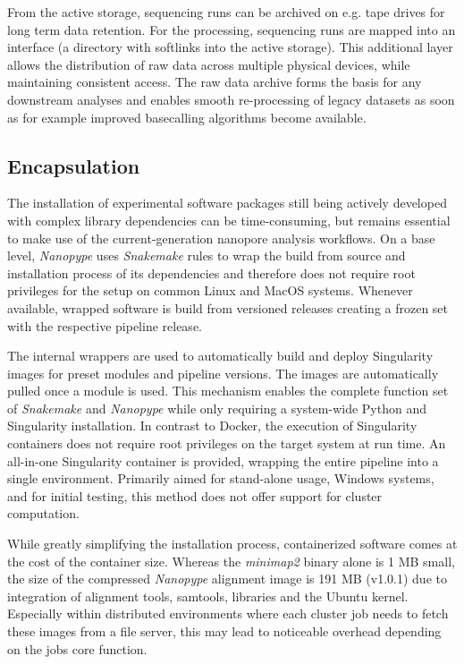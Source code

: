 From the active storage, sequencing runs can be archived on e.g. tape drives for long term data retention. For the processing, sequencing runs are mapped into an interface (a directory with softlinks into the active storage). This additional layer allows the distribution of raw data across multiple physical devices, while maintaining consistent access.
The raw data archive forms the basis for any downstream analyses and enables smooth re-processing of legacy datasets as soon as for example improved basecalling algorithms become available.


\subsection{Encapsulation}
\label{subsec:nanopype:encapsulation}
The installation of experimental software packages still being actively developed with complex library dependencies can be time-consuming, but remains essential to make use of the current-generation nanopore analysis workflows. On a base level, \textit{Nanopype} uses \textit{Snakemake} rules to wrap the build from source and installation process of its dependencies and therefore does not require root privileges for the setup on common Linux and MacOS systems. Whenever available, wrapped software is build from versioned releases creating a frozen set with the respective pipeline release.

The internal wrappers are used to automatically build and deploy Singularity images for preset modules and pipeline versions. The images are automatically pulled once a module is used. This mechanism enables the complete function set of \textit{Snakemake} and \textit{Nanopype} while only requiring a system-wide Python and Singularity installation. In contrast to Docker, the execution of Singularity containers does not require root privileges on the target system at run time.
An all-in-one Singularity container is provided, wrapping the entire pipeline into a single environment. Primarily aimed for stand-alone usage, Windows systems, and for initial testing, this method does not offer support for cluster computation.

While greatly simplifying the installation process, containerized software comes at the cost of the container size. Whereas the \textit{minimap2} binary alone is 1 MB small, the size of the compressed \textit{Nanopype} alignment image is 191 MB (v1.0.1) due to integration of alignment tools, samtools, libraries and the Ubuntu kernel. Especially within distributed environments where each cluster job needs to fetch these images from a file server, this may lead to noticeable overhead depending on the jobs core function.


